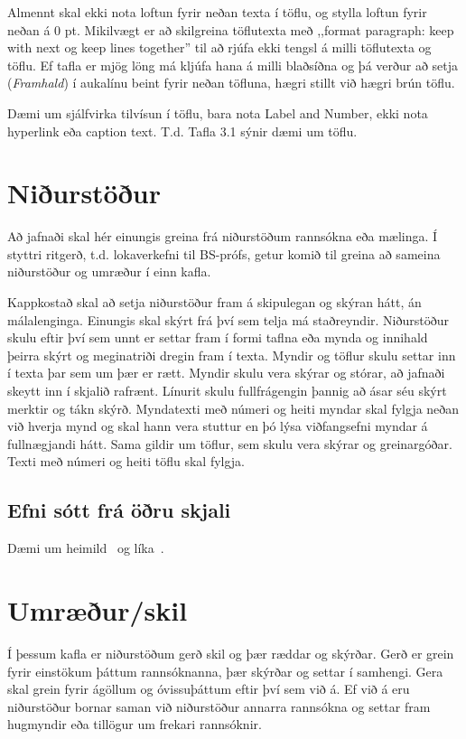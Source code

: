 \documentclass[a4paper,12pt,twoside,BCOR=10mm]{scrbook}
\begin{document}
Almennt skal ekki nota loftun fyrir neðan texta í töflu, og stylla loftun fyrir neðan á 0 pt.
Mikilvægt er að skilgreina töflutexta með ,,format paragraph: keep with next og keep lines together” til að rjúfa ekki tengsl á milli töflutexta og töflu. Ef tafla er mjög löng má kljúfa hana á milli blaðsíðna og þá verður að setja (\textit{Framhald}) í aukalínu beint fyrir neðan töfluna, hægri stillt við hægri brún töflu.

Dæmi um sjálfvirka tilvísun í töflu, bara nota Label and Number, ekki nota hyperlink eða caption text. T.d. Tafla 3.1 sýnir dæmi um töflu.

\chapter{Niðurstöður}
Að jafnaði skal hér einungis greina frá niðurstöðum rannsókna eða mælinga. Í styttri ritgerð, t.d. lokaverkefni til BS-prófs, getur komið til greina að sameina niðurstöður og umræður í einn kafla.

Kappkostað skal að setja niðurstöður fram á skipulegan og skýran hátt, án málalenginga. Einungis skal skýrt frá því sem telja má staðreyndir. Niðurstöður skulu eftir því sem unnt er settar fram í formi taflna eða mynda og innihald þeirra skýrt og meginatriði dregin fram í texta. Myndir og töflur skulu settar inn í texta þar sem um þær er rætt. Myndir skulu vera skýrar og stórar, að jafnaði skeytt inn í skjalið rafrænt. Línurit skulu fullfrágengin þannig að ásar séu skýrt merktir og tákn skýrð. Myndatexti með númeri og heiti myndar skal fylgja neðan við hverja mynd og skal hann vera stuttur en þó lýsa viðfangsefni myndar á fullnægjandi hátt. Sama gildir um töflur, sem skulu vera skýrar og greinargóðar. Texti með númeri og heiti töflu skal fylgja.

\section{Efni sótt frá öðru skjali}
Dæmi um heimild~\cite{dirac} og líka~\cite{einstein}.


\chapter{Umræður/skil}
Í þessum kafla er niðurstöðum gerð skil og þær ræddar og skýrðar. Gerð er grein fyrir einstökum þáttum rannsóknanna, þær skýrðar og settar í samhengi. Gera skal grein fyrir ágöllum og óvissuþáttum eftir því sem við á. Ef við á eru niðurstöður bornar saman við niðurstöður annarra rannsókna og settar fram hugmyndir eða tillögur um frekari rannsóknir.
\end{document}
